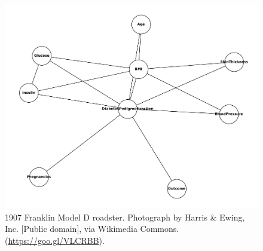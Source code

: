 \documentclass[acmsmall,sigconf]{acmart}
\begin{document}
\begin{figure}[h]
  \centering
  \includegraphics[width=\linewidth]{adult_mst}
  \caption{1907 Franklin Model D roadster. Photograph by Harris \&
    Ewing, Inc. [Public domain], via Wikimedia
    Commons. (\url{https://goo.gl/VLCRBB}).}
\end{figure}






\end{document}
